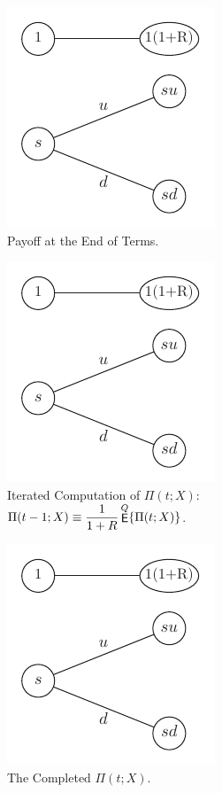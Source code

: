 \documentclass[10pt,handout]{beamer}
\newcommand{\ds}{\displaystyle}
\DeclareMathOperator\expc{{\sf E}}
\theoremstyle{definition}
\begin{document}
\begin{frame}
  \begin{figure}[!htbp]
    \centering
    \includegraphics[scale=1,page=5]{fig/note08/bjork.pdf}
    \caption{Payoff at the End of Terms.}
  \end{figure}
\end{frame}

\begin{frame}
  \begin{figure}[!htbp]
    \centering
    \includegraphics[scale=1,page=7]{fig/note08/bjork.pdf}
    \caption{Iterated Computation of $\ds\Pi(t;X):\;$ $\ds\Pi(t-1; X)\equiv\frac{1}{1+R}\expc^Q\{\Pi(t; X)\}$.} %
  \end{figure}
\end{frame}

\begin{frame}
  \begin{figure}[!htbp]
    \centering
    \includegraphics[scale=1,page=9]{fig/note08/bjork.pdf}
    \caption{The Completed $\Pi(t; X)$.} 
  \end{figure}
\end{frame}
\end{document}
